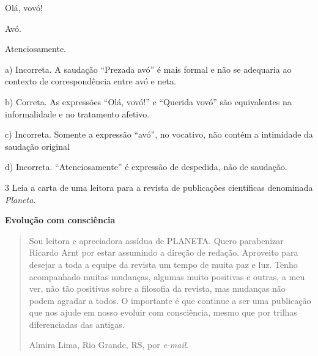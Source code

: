 \begin{escolha}
\begin{escolha}
\item Olá, vovó!

\item Avó.

\item Atenciosamente.
\end{escolha}


a) Incorreta. A saudação ``Prezada avó'' é mais formal e não se adequaria
ao contexto de correspondência entre avó e neta.

b) Correta. As expressões ``Olá, vovó!'' e ``Querida vovó'' são 
equivalentes na informalidade e no tratamento afetivo. 

c) Incorreta. Somente a expressão ``avó'', no vocativo, não contém
a intimidade da saudação original

d) Incorreta. ``Atenciosamente'' é expressão de despedida, não de saudação.

\num{3} Leia a carta de uma leitora para a revista de publicações
científicas denominada \textit{Planeta}.


\textbf{Evolução com consciência}

\begin{quote}
Sou leitora e apreciadora assídua de PLANETA. Quero parabenizar Ricardo
Arnt por estar assumindo a direção de redação. Aproveito para desejar a
toda a equipe da revista um tempo de muita paz e luz. Tenho acompanhado
muitas mudanças, algumas muito positivas e outras, a meu ver, não tão
positivas sobre a filosofia da revista, mas mudanças não podem agradar a
todos. O importante é que continue a ser uma publicação que nos ajude em
nosso evoluir com consciência, mesmo que por trilhas diferenciadas das
antigas.

\begin{flushright}
Almira Lima, Rio Grande, RS, por \emph{e-mail}.
\end{flushright}
\end{quote}



\end{escolha}
